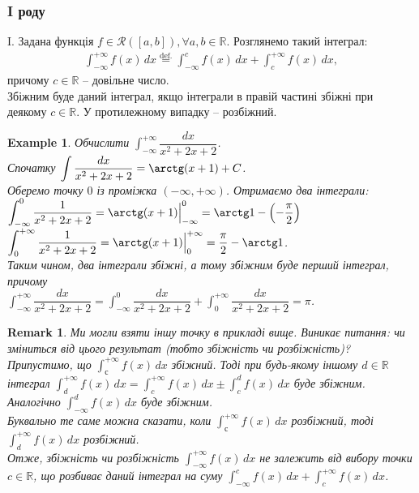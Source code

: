 \documentclass[a4paper, 10pt]{article}
\theoremstyle{theoremdd}
\theoremstyle{theoremdd}
\theoremstyle{theoremdd}
\theoremstyle{theoremdd}
\theoremstyle{theoremdd}
\newtheorem{example}[theorem]{Example}
\theoremstyle{theoremdd}
\theoremstyle{theoremdd}
\newtheorem{remark}[theorem]{Remark}
\theoremstyle{theoremdd}
\theoremstyle{theoremdd}
\begin{document}
\subsubsection{I роду}
I. Задана функція $f \in \mathcal{R}([a,b]), \forall a,b \in \mathbb{R}$. Розглянемо такий інтеграл:
\begin{align*}
\int_{-\infty}^{+\infty} f(x)\,dx \overset{\text{def.}}{=} \int_{-\infty}^c f(x)\,dx + \int_c^{+\infty} f(x)\,dx,
\end{align*}
причому $c \in \mathbb{R}$ -- довільне число.\\
Збіжним буде даний інтеграл, якщо інтеграли в правій частині збіжні при деякому $c \in \mathbb{R}$. У протилежному випадку -- розбіжний.

\begin{example}
Обчислити $\displaystyle\int_{-\infty}^{+\infty} \dfrac{dx}{x^2+2x+2}$.\\
Спочатку $\displaystyle\int \dfrac{dx}{x^2+2x+2} = \arctg (x+1) + C$.\\
Оберемо точку $0$ із проміжка $(-\infty,+\infty)$. Отримаємо два інтеграли:\\
$\displaystyle\int_{-\infty}^0 \dfrac{1}{x^2+2x+2} = \arctg(x+1) \Big|_{-\infty}^0 = \arctg 1 - \left( - \dfrac{\pi}{2} \right)$\\
$\displaystyle\int_0^{+\infty} \dfrac{1}{x^2+2x+2} = \arctg(x+1) \Big|_0^{+\infty} = \dfrac{\pi}{2} - \arctg 1$.\\
Таким чином, два інтеграли збіжні, а тому збіжним буде перший інтеграл, причому\\
$\displaystyle\int_{-\infty}^{+\infty} \dfrac{dx}{x^2+2x+2} = \int_{-\infty}^{0} \dfrac{dx}{x^2+2x+2} + \int_{0}^{+\infty} \dfrac{dx}{x^2+2x+2} = \pi$.
\end{example}

\begin{remark}
Ми могли взяти іншу точку в прикладі вище. Виникає питання: чи зміниться від цього результат (тобто збіжність чи розбіжність)?\\
Припустимо, що $\displaystyle\int_{с}^{+\infty} f(x)\,dx$ збіжний. Тоді при будь-якому іншому $d \in \mathbb{R}$ інтеграл $\displaystyle\int_{d}^{+\infty} f(x)\,dx = \int_{c}^{+\infty} f(x)\,dx \pm \int_c^d f(x)\,dx$ буде збіжним. Аналогічно $\displaystyle\int_{-\infty}^d f(x)\,dx$ буде збіжним.\\
Буквально те саме можна сказати, коли $\displaystyle\int_{с}^{+\infty} f(x)\,dx$ розбіжний, тоді $\displaystyle\int_{d}^{+\infty} f(x)\,dx$ розбіжний.\\
Отже, збіжність чи розбіжність $\displaystyle\int_{-\infty}^{+\infty} f(x)\,dx$ не залежить від вибору точки $c \in \mathbb{R}$, що розбиває даний інтеграл на суму $\displaystyle\int_{-\infty}^c f(x)\,dx + \int_c^{+\infty} f(x)\,dx$.
\end{remark}
\end{document}
